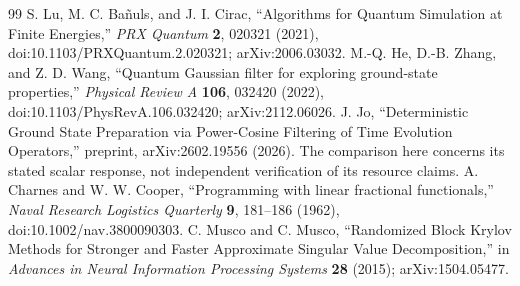 \documentclass[11pt,a4paper]{article}
\begin{document}
{\begin{thebibliography}{99}
 S. Lu, M. C. Ba\~nuls, and J. I. Cirac, ``Algorithms for Quantum Simulation at Finite Energies,'' \emph{PRX Quantum} \textbf{2}, 020321 (2021), doi:10.1103/PRXQuantum.2.020321; arXiv:2006.03032.
 M.-Q. He, D.-B. Zhang, and Z. D. Wang, ``Quantum Gaussian filter for exploring ground-state properties,'' \emph{Physical Review A} \textbf{106}, 032420 (2022), doi:10.1103/PhysRevA.106.032420; arXiv:2112.06026.
 J. Jo, ``Deterministic Ground State Preparation via Power-Cosine Filtering of Time Evolution Operators,'' preprint, arXiv:2602.19556 (2026). The comparison here concerns its stated scalar response, not independent verification of its resource claims.
 A. Charnes and W. W. Cooper, ``Programming with linear fractional functionals,'' \emph{Naval Research Logistics Quarterly} \textbf{9}, 181--186 (1962), doi:10.1002/nav.3800090303.
 C. Musco and C. Musco, ``Randomized Block Krylov Methods for Stronger and Faster Approximate Singular Value Decomposition,'' in \emph{Advances in Neural Information Processing Systems} \textbf{28} (2015); arXiv:1504.05477.
\end{thebibliography}
}
\end{document}
